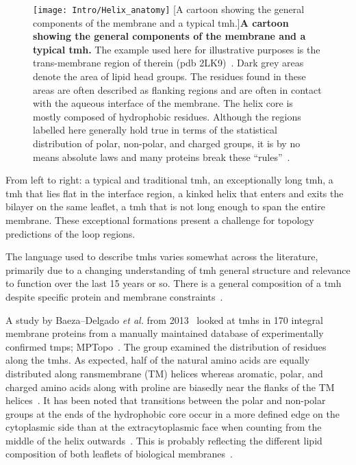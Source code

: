 \begin{figure}[!ht]
\centering
\texttt{[image: Intro/Helix\_anatomy]}
		[A cartoon showing the general components of the membrane and a typical \gls{tmh}.]{\textbf{A cartoon showing the general components of the membrane and a typical \gls{tmh}.}
The example used here for illustrative purposes is the trans-membrane region of therein (\gls{pdb} 2LK9)~\cite{Skasko2012}.
Dark grey areas denote the area of lipid head groups.
The residues found in these areas are often described as flanking regions and are often in contact with the aqueous interface of the membrane.
The helix core is mostly composed of hydrophobic residues.
Although the regions labelled here generally hold true in terms of the statistical distribution of polar, non-polar, and charged groups, it is by no means absolute laws and many proteins break these ``rules''~\cite{Sharpe2010, Baeza-Delgado2013, Pogozheva2013}.}

\label{fig:helixcartoon1}
\end{figure}

From left to right: a typical and traditional \gls{tmh}, an exceptionally long \gls{tmh}, a \gls{tmh} that lies flat in the interface region, a kinked helix that enters and exits the bilayer on the same leaflet, a \gls{tmh} that is not long enough to span the entire membrane.
These exceptional formations present a challenge for topology predictions of the loop regions.

The language used to describe \gls{tmh}s varies somewhat across the literature, primarily due to a changing understanding of \gls{tmh} general structure and relevance to function over the last 15 years or so.
There is a general composition of a \gls{tmh} despite specific protein and membrane constraints~\cite{Sharpe2010}.

A study by Baeza\---Delgado \textit{ et al.} from 2013~\cite{Baeza-Delgado2013} looked at \gls{tmh}s in 170 integral membrane proteins from a manually maintained database of experimentally confirmed \gls{tmp}s; MPTopo~\cite{Jayasinghe2001}.
The group examined the distribution of residues along the \gls{tmh}s.
As expected, half of the natural amino acids are equally distributed along ransmembrane (TM) helices whereas aromatic, polar, and charged amino acids along with proline are biasedly near the flanks of the TM helices~\cite{Baeza-Delgado2013}.
It has been noted that transitions between the polar and non-polar groups at the ends of the hydrophobic core occur in a more defined edge on the cytoplasmic side than at the extracytoplasmic face when counting from the middle of the helix outwards~\cite{Baeza-Delgado2013}.
This is probably reflecting the different lipid composition of both leaflets of biological membranes~\cite{Baeza-Delgado2013}.

